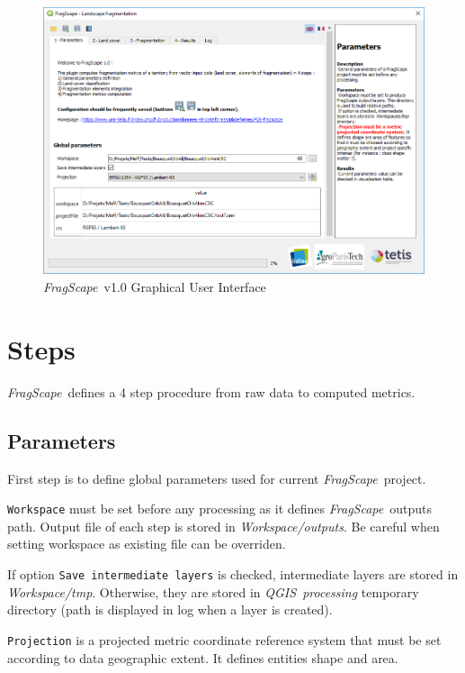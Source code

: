 \documentclass[11pt]{article}
\newcommand{\source}[1]{\vspace*{-0.4cm}\caption*{\textit{Source: {#1}}}}
\newcommand{\tool}{\emph{FragScape}}
\newcommand{\qgis}{\emph{QGIS}}
\begin{document}
\begin{figure}[h!]
    \centering
    \includegraphics[scale=0.7]{pictures/paramsTab.png}
    \caption{\tool\ v1.0 Graphical User Interface}
    \label{fig:paramsTab}
\end{figure}

\pagebreak

\section{Steps}

\tool\ defines a 4 step procedure from raw data to computed metrics.

\subsection{Parameters}

First step is to define global parameters used for current \tool\ project.

\texttt{Workspace} must be set before any processing as it defines \tool\ outputs path. Output file of each step is stored in \textit{Workspace/outputs}. Be careful when setting workspace as existing file can be overriden.

If option \texttt{Save intermediate layers} is checked, intermediate layers are stored in \textit{Workspace/tmp}. Otherwise, they are stored in \qgis\ \textit{processing} temporary directory (path is displayed in log when a layer is created).

\texttt{Projection} is a projected metric coordinate reference system that must be set according to data geographic extent. It defines entities shape and area. 
\end{document}
